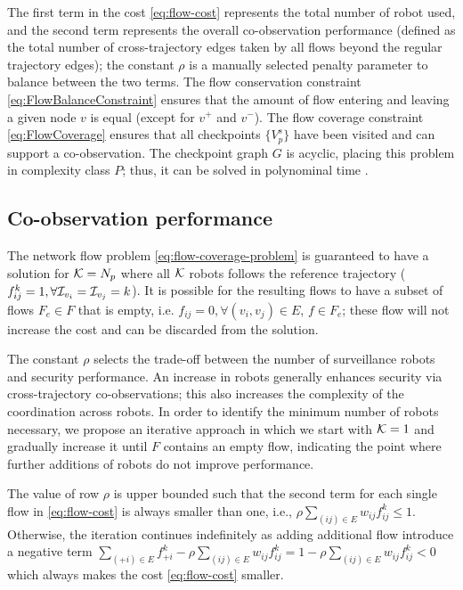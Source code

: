 \documentclass[10pt,twocolumn,twoside]{IEEEtran}
\begin{document}
The first term in the cost \eqref{eq:flow-cost} represents the total number of robot used, and the second term represents the overall co-observation performance (defined as the total number of cross-trajectory edges taken by all flows beyond the regular trajectory edges); the constant $\rho$ is a manually selected penalty parameter to balance between the two terms. 
The flow conservation constraint \eqref{eq:FlowBalanceConstraint} ensures that the amount of flow entering and leaving a given node $v$ is equal (except for $v^{+}$ and $v^{-}$). The flow coverage constraint \eqref{eq:FlowCoverage} ensures that all checkpoints $ \{V^{s}_{p}\}$ have been visited and can support a co-observation. The checkpoint graph $G$ is acyclic, placing this problem in complexity class $P$; thus, it can be solved in polynominal time \cite{1702662}. 

\subsection{Co-observation performance}
The network flow problem \eqref{eq:flow-coverage-problem} is guaranteed to have a solution for $\mathcal{K}=N_{p}$ where all $\mathcal{K}$ robots follows the reference trajectory ($f^{k}_{ij}=1, \forall \mathcal{I}_{v_{i}}=\mathcal{I}_{v_{j}}=k$).  %
It is possible for the resulting flows to have a subset of flows $F_{e} \in F$ that is empty, i.e. $f_{ij}=0, \forall (v_{i},v_{j})\in E$, $f\in F_{e}$; these flow will not increase the cost and can be discarded from the solution.  

The constant $\rho$ selects the trade-off between the number of surveillance robots and security performance. An increase in robots generally enhances security via cross-trajectory co-observations; this also increases the complexity of the coordination across robots. In order to identify the minimum number of robots necessary, we propose an iterative approach in which we start with $\mathcal{K}=1$ and gradually increase it until $F$ contains an empty flow, indicating the point where further additions of robots do not improve performance. 

\begin{remark} 
The value of row $\rho$ is upper bounded such that the second term for each single flow in \eqref{eq:flow-cost} is always smaller than one, i.e., $ \rho \sum_{(ij)\in E} w_{ij} f^k_{ij}\leq 1$. Otherwise, the iteration continues indefinitely as adding additional flow introduce a negative term $\sum_{(+i)\in E} f^{k}_{+i} - \rho\sum_{(ij)\in E} w_{ij} f^k_{ij} = 1- \rho\sum_{(ij)\in E} w_{ij} f^k_{ij}<0$ which always makes the cost \eqref{eq:flow-cost} smaller.
\end{remark}
\end{document}

